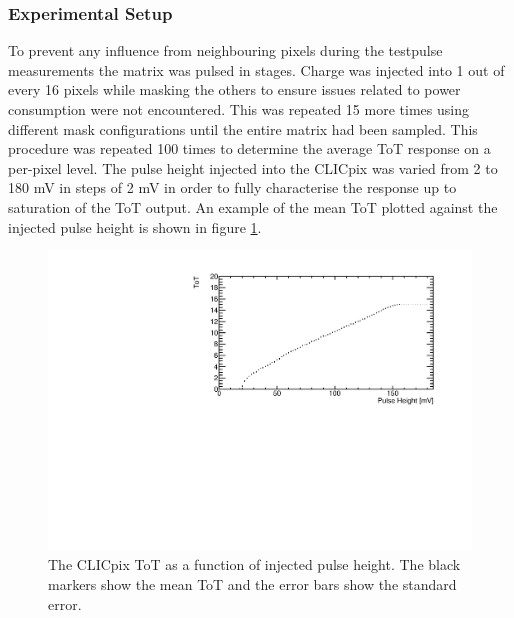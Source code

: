 
\subsubsection{Experimental Setup}

To prevent any influence from neighbouring pixels during the testpulse measurements the matrix was pulsed in stages.  Charge was injected into 1 out of every 16 pixels while masking the others to ensure issues related to power consumption were not encountered.  This was repeated 15 more times using different mask configurations until the entire matrix had been sampled.  This procedure was repeated 100 times to determine the average ToT response on a per-pixel level.  The pulse height injected into the CLICpix was varied from 2 to 180 mV in steps of 2 mV in order to fully characterise the response up to saturation of the ToT output.  An example of the mean ToT plotted against the injected pulse height is shown in figure \ref{fig:testpulseexamplenofit}.  

\begin{figure}[h!]
\centering
\includegraphics[width=1.0\textwidth]{CLICdpVertex/Plots/TestPulseCalibration/Fits/Set9/ToT_PulseHeight_Set_9_ChipID_001ec0db94b1_Pixel_x0_y0_NoFit.pdf}
\caption[The CLICpix ToT as a function of injected pulse height.  The black markers show the mean ToT and the error bars show the standard error.]{The CLICpix ToT as a function of injected pulse height.  The black markers show the mean ToT and the error bars show the standard error.}
\label{fig:testpulseexamplenofit}
\end{figure}

